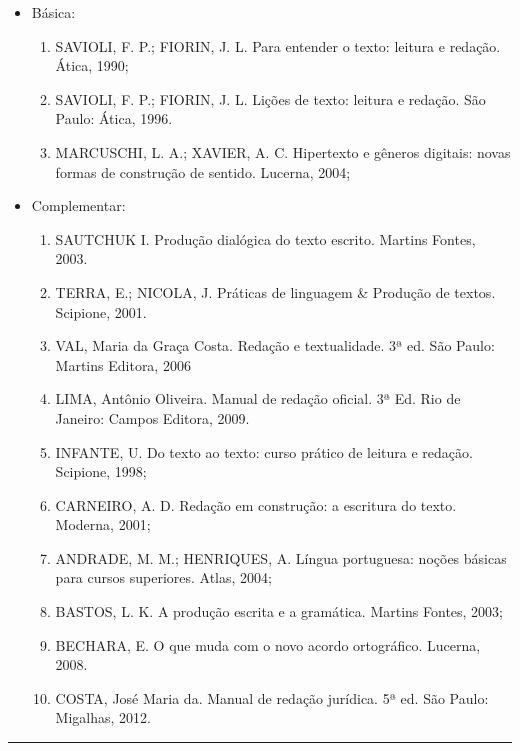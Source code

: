 \begin{itemize} 	 
  \item Básica:
	\begin{enumerate}
	\item SAVIOLI, F. P.; FIORIN, J. L.  Para entender o texto: leitura e redação. Ática, 1990;  
	\item SAVIOLI, F. P.; FIORIN, J. L. Lições de texto: leitura e redação. São Paulo: Ática, 1996. 
	\item MARCUSCHI, L. A.; XAVIER, A. C. Hipertexto e gêneros digitais: novas formas de construção de sentido. Lucerna, 2004;
	\end{enumerate}
  \item Complementar:
	\begin{enumerate} 
	\item SAUTCHUK I. Produção dialógica do texto escrito. Martins Fontes, 2003.
	\item TERRA, E.; NICOLA, J. Práticas de linguagem \& Produção de textos. Scipione, 2001.
	\item VAL, Maria da Graça Costa. Redação e textualidade. 3ª ed. São Paulo: Martins Editora, 2006
	\item LIMA, Antônio Oliveira. Manual de redação oficial. 3ª Ed. Rio de Janeiro: Campos Editora, 2009.
	\item INFANTE, U. Do texto ao texto: curso prático de leitura e redação. Scipione, 1998; 
	\item CARNEIRO, A. D. Redação em construção: a escritura do texto. Moderna, 2001;
	\item ANDRADE, M. M.; HENRIQUES, A. Língua portuguesa: noções básicas para cursos superiores. Atlas, 2004;
	\item BASTOS, L. K. A produção escrita e a gramática. Martins Fontes, 2003;
	\item BECHARA, E. O que muda com o novo acordo ortográfico. Lucerna, 2008.
	\item COSTA, José Maria da. Manual de redação jurídica. 5ª ed. São Paulo: Migalhas, 2012.
	\end{enumerate}
\end{itemize}
\noindent\rule{16.5cm}{0.4pt}\\
\\
